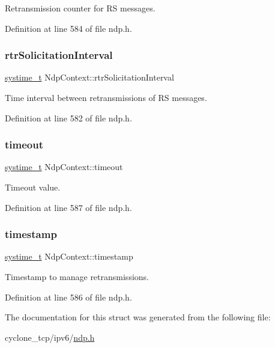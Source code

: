 Retransmission counter for RS messages. 



Definition at line 584 of file ndp.\+h.

\mbox{\label{structNdpContext_aeb312645a94a797c2e509c4753562fb4}} 
\subsubsection{\texorpdfstring{rtr\+Solicitation\+Interval}{rtrSolicitationInterval}}
{\footnotesize\ttfamily \hyperlink{compiler__port_8h_ae3e32a98d431a02106616da3071832dd}{systime\+\_\+t} Ndp\+Context\+::rtr\+Solicitation\+Interval}



Time interval between retransmissions of RS messages. 



Definition at line 582 of file ndp.\+h.

\mbox{\label{structNdpContext_a25bace7e12dfc4b36791709f5cf836ac}} 
\subsubsection{\texorpdfstring{timeout}{timeout}}
{\footnotesize\ttfamily \hyperlink{compiler__port_8h_ae3e32a98d431a02106616da3071832dd}{systime\+\_\+t} Ndp\+Context\+::timeout}



Timeout value. 



Definition at line 587 of file ndp.\+h.

\mbox{\label{structNdpContext_a141f76af5b53aa964be76110f7c80791}} 
\subsubsection{\texorpdfstring{timestamp}{timestamp}}
{\footnotesize\ttfamily \hyperlink{compiler__port_8h_ae3e32a98d431a02106616da3071832dd}{systime\+\_\+t} Ndp\+Context\+::timestamp}



Timestamp to manage retransmissions. 



Definition at line 586 of file ndp.\+h.



The documentation for this struct was generated from the following file\+:\begin{DoxyCompactItemize}
\item 
cyclone\+\_\+tcp/ipv6/\hyperlink{ndp_8h}{ndp.\+h}\end{DoxyCompactItemize}
